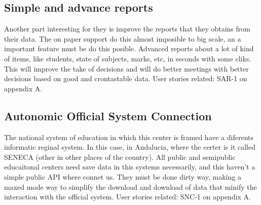 \subsection{Simple and advance reports}

Another part interesting for they is improve the reports that they obtains from
their data. The on paper support do this almost imposible to big scale, an a
important feature must be do this posible. Advanced reports about a lot of kind
of items, like students, state of subjects, marks, etc, in seconds with some cliks.
This will improve the take of decisions and will do better meetings with better
decisions based on good and crontastable data.
\intro
User stories related: SAR-1 on appendix A.

\subsection{Autonomic Official System Connection}

The national system of education in which this center is framed have a diferents
informatic reginal system. In this case, in Andalucia, where the certer is it called
SENECA (other in other places of the country). All public and semipublic educaitonal
centers need save data in this systems necessarily, and this haven't a simple public
API where connet us. They must be done dirty way, making a maxed mode way to simplify
the download and download of data that minify the interaction with the official system.
\intro
User stories related: SNC-1 on appendix A.
